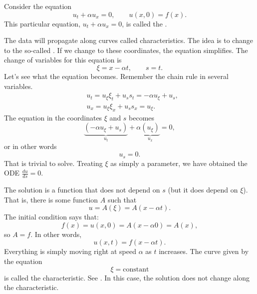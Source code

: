 \begin{example}
Consider the equation
\begin{equation*}
u_t + \alpha u_x = 0, \qquad u(x,0) = f(x) .
\end{equation*}
This particular equation, $u_t + \alpha u_x = 0$, is
called the \emph{}.

The data will propagate along curves called characteristics.  The
idea is to change to the
so-called \emph{}.  If we change to these
coordinates, the equation simplifies.  The change of variables for this
equation is
\begin{equation*}
\xi = x - \alpha t ,  \qquad s = t .
\end{equation*}
Let's see what the equation becomes. Remember the chain rule in several
variables.
\begin{align*}
& u_t = u_\xi \xi_t + u_s s_t = - \alpha u_\xi + u_s , \\
& u_x = u_\xi \xi_x + u_s s_x = u_\xi .
\end{align*}
The equation in the coordinates $\xi$ and $s$ becomes
\begin{equation*}
\underbrace{(- \alpha u_\xi + u_s)}_{u_t} + \alpha
\underbrace{(u_\xi)}_{u_x} = 0 ,
\end{equation*}
or in other words
\begin{equation*}
u_s = 0 .
\end{equation*}
That is trivial to solve.  Treating $\xi$ as simply a parameter, we have
obtained the ODE $\frac{d u}{d s} = 0$.

The solution is a function that does
not depend on $s$ (but it does depend on $\xi$).
That is, there is some function $A$ such that
\begin{equation*}
u = A(\xi) = A(x - \alpha t) .
\end{equation*}
The initial condition says that:
\begin{equation*}
f(x) = u(x,0) = A(x - \alpha 0) = A(x) ,
\end{equation*}
so $A=f$.  In other words,
\begin{equation*}
u(x,t) = f(x-\alpha t) .
\end{equation*}
Everything is simply moving right at speed $\alpha$ as $t$ increases.
The curve given by the equation
\begin{equation*}
\xi = \text{constant}
\end{equation*}
is called the characteristic.
See .
In this case, the solution does not change
along the characteristic.


\end{example}
